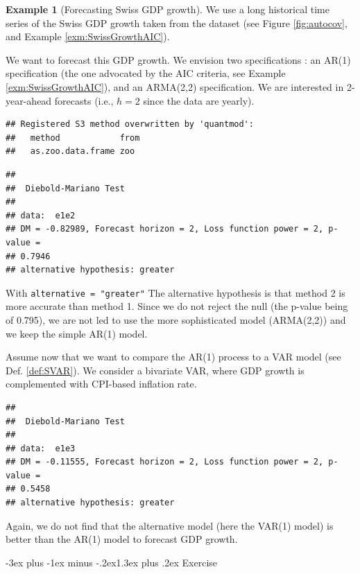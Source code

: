 \documentclass[
  11pt,
]{book}
\makeatletter
\renewcommand\section{\@startsection{section}{1}{\z@}
  {-3ex plus -1ex minus -.2ex}{1.3ex plus .2ex}
  {\normalfont\Large\bfseries\color{TextbookInk}}}
\theoremstyle{definition}
\theoremstyle{definition}
\newtheorem{example}{Example}[chapter]
\theoremstyle{definition}
\theoremstyle{definition}
\theoremstyle{remark}
\makeatother
\begin{document}
\begin{example}[Forecasting Swiss GDP growth]
\protect\hypertarget{exm:SwissOutOfSample}{}\label{exm:SwissOutOfSample}We use a long historical time series of the Swiss GDP growth taken from the \citet{JST_2017} dataset (see Figure \ref{fig:autocov}, and Example \ref{exm:SwissGrowthAIC}).

We want to forecast this GDP growth. We envision two specifications : an AR(1) specification (the one advocated by the AIC criteria, see Example \ref{exm:SwissGrowthAIC}), and an ARMA(2,2) specification. We are interested in 2-year-ahead forecasts (i.e., \(h=2\) since the data are yearly).

\begin{verbatim}
## Registered S3 method overwritten by 'quantmod':
##   method            from
##   as.zoo.data.frame zoo
\end{verbatim}

\begin{verbatim}
## 
##  Diebold-Mariano Test
## 
## data:  e1e2
## DM = -0.82989, Forecast horizon = 2, Loss function power = 2, p-value =
## 0.7946
## alternative hypothesis: greater
\end{verbatim}

With \texttt{alternative\ =\ "greater"} The alternative hypothesis is that method 2 is more accurate than method 1. Since we do not reject the null (the p-value being of 0.795), we are not led to use the more sophisticated model (ARMA(2,2)) and we keep the simple AR(1) model.

Assume now that we want to compare the AR(1) process to a VAR model (see Def. \ref{def:SVAR}). We consider a bivariate VAR, where GDP growth is complemented with CPI-based inflation rate.

\begin{verbatim}
## 
##  Diebold-Mariano Test
## 
## data:  e1e3
## DM = -0.11555, Forecast horizon = 2, Loss function power = 2, p-value =
## 0.5458
## alternative hypothesis: greater
\end{verbatim}

Again, we do not find that the alternative model (here the VAR(1) model) is better than the AR(1) model to forecast GDP growth.
\end{example}

\section{Exercise}\label{forecasting-exercises}
\end{document}
